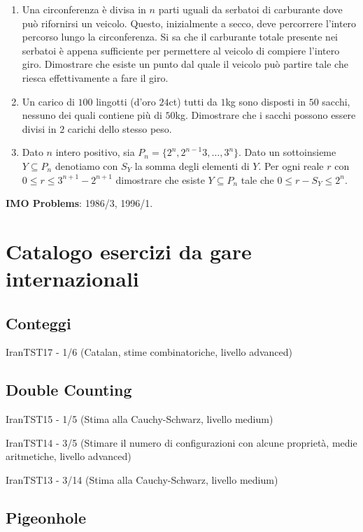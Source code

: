 \documentclass[a4paper,10pt]{article}
\newcommand{\Pro}[3]{#1#2 - #3}
\begin{document}
\begin{enumerate}
	\item Una circonferenza \`e divisa in $n$ parti uguali da serbatoi di carburante dove pu\`o rifornirsi un veicolo. Questo, inizialmente a secco, deve percorrere l'intero percorso lungo la circonferenza. Si sa che il carburante totale presente nei serbatoi \`e appena sufficiente per permettere al veicolo di compiere l'intero giro. Dimostrare che esiste un punto dal quale il veicolo pu\`o partire tale che riesca effettivamente a fare il giro.

	\item Un carico di $100$ lingotti (d'oro $24$ct) tutti da $1$kg sono disposti in $50$ sacchi, nessuno dei quali contiene pi\`u di $50$kg. Dimostrare che i sacchi possono essere divisi in $2$ carichi dello stesso peso.

	\item Dato $n$ intero positivo, sia $P_n=\{2^n,2^{n-1}3,\dots,3^n\}$. Dato un sottoinsieme $Y\subseteq P_n$ denotiamo con $S_Y$ la somma degli elementi di $Y$. Per ogni reale $r$ con $0\leq r \leq 3^{n+1} -	2^{n+1}$ dimostrare che esiste $Y\subseteq P_n$ tale che $0\leq r-S_Y \leq 2^n$.

\end{enumerate}
\bigskip\bigskip

\textbf{IMO Problems}: 1986/3, 1996/1.


\section{Catalogo esercizi da gare internazionali}

\subsection{Conteggi}

\Pro{IranTST}{17}{1/6} (Catalan, stime combinatoriche, livello advanced)

\subsection{Double Counting}

\Pro{IranTST}{15}{1/5} (Stima alla Cauchy-Schwarz, livello medium)

\Pro{IranTST}{14}{3/5} (Stimare il numero di configurazioni con alcune proprietà, medie aritmetiche, livello advanced)

\Pro{IranTST}{13}{3/14} (Stima alla Cauchy-Schwarz, livello medium)

\subsection{Pigeonhole}
\end{document}
